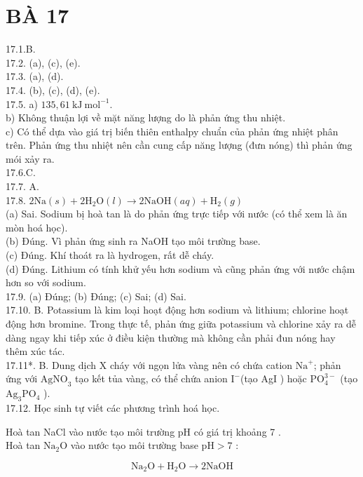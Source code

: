 \documentclass[10pt]{article}
\begin{document}
\section*{BÀ 17}
17.1.B.\\
17.2. (a), (c), (e).\\
17.3. (a), (d).\\
17.4. (b), (c), (d), (e).\\
17.5. a) $135,61 \mathrm{~kJ} \mathrm{~mol}^{-1}$.\\
b) Không thuận lợi về mặt năng lượng do là phản ứng thu nhiệt.\\
c) Có thể dựa vào giá trị biến thiên enthalpy chuẩn của phản ứng nhiệt phân trên. Phản ứng thu nhiệt nên cần cung cấp năng lượng (đưn nóng) thì phản ứng mói xảy ra.\\
17.6.C.\\
17.7. A.\\
17.8. $2 \mathrm{Na}(s)+2 \mathrm{H}_{2} \mathrm{O}(l) \rightarrow 2 \mathrm{NaOH}(a q)+\mathrm{H}_{2}(g)$\\
(a) Sai. Sodium bị hoà tan là do phản ứng trực tiếp với nước (có thể xem là ăn mòn hoá học).\\
(b) Đúng. Vì phản ứng sinh ra NaOH tạo môi trường base.\\
(c) Đúng. Khí thoát ra là hydrogen, rất dễ cháy.\\
(d) Đúng. Lithium có tính khử yếu hơn sodium và cũng phản ứng với nước chậm hơn so với sodium.\\
17.9. (a) Đúng; (b) Đúng; (c) Sai; (d) Sai.\\
17.10. B. Potassium là kim loại hoạt động hơn sodium và lithium; chlorine hoạt động hơn bromine. Trong thực tế, phản ứng giữa potassium và chlorine xảy ra dễ dàng ngay khi tiếp xúc ở điều kiện thường mà không cần phải đun nóng hay thêm xúc tác.\\
17.11*. B. Dung dịch X cháy với ngọn lửa vàng nên có chứa cation $\mathrm{Na}^{+}$; phản ứng với $\mathrm{AgNO}_{3}$ tạo kết tủa vàng, có thể chứa anion $\mathrm{I}^{-}$(tạo AgI ) hoặc $\mathrm{PO}_{4}^{3-}$ (tạo $\mathrm{Ag}_{3} \mathrm{PO}_{4}$ ).\\
17.12. Học sinh tự viết các phương trình hoá học.

Hoà tan NaCl vào nước tạo môi trường pH có giá trị khoảng 7 .\\
Hoà tan $\mathrm{Na}_{2} \mathrm{O}$ vào nước tạo môi trường base $\mathrm{pH}>7$ :

$$
\mathrm{Na}_{2} \mathrm{O}+\mathrm{H}_{2} \mathrm{O} \rightarrow 2 \mathrm{NaOH}
$$
\end{document}

